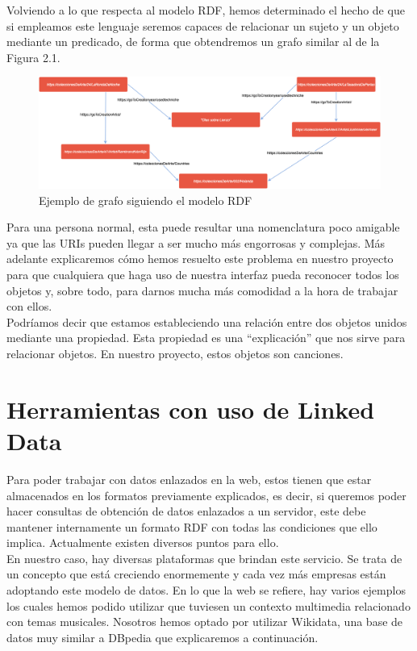 Volviendo a lo que respecta al modelo RDF, hemos determinado el hecho de que si empleamos este lenguaje seremos capaces de relacionar un sujeto y un objeto mediante un predicado, de forma que obtendremos un grafo similar al de la Figura 2.1.\\

\begin{figure}[h!]
	\centering
	\includegraphics[width = 1\textwidth]{Imagenes/Bitmap/RDFexample.png}
	\caption{Ejemplo de grafo siguiendo el modelo RDF}
	\label{fig:sampleImage}
\end{figure}

Para una persona normal, esta puede resultar una nomenclatura poco amigable ya que las URIs pueden llegar a ser mucho más engorrosas y complejas. Más adelante explicaremos cómo hemos resuelto este problema en nuestro proyecto para que cualquiera que haga uso de nuestra interfaz pueda reconocer todos los objetos y, sobre todo, para darnos mucha más comodidad a la hora de trabajar con ellos.\\

Podríamos decir que estamos estableciendo una relación entre dos objetos unidos mediante una propiedad. Esta propiedad es una ``explicación'' que nos sirve para relacionar objetos. En nuestro proyecto, estos objetos son canciones.\\


\section{Herramientas con uso de Linked Data}

Para poder trabajar con datos enlazados en la web, estos tienen que estar almacenados en los formatos previamente explicados, es decir, si queremos poder hacer consultas de obtención de datos enlazados a un servidor, este debe mantener internamente un formato RDF con todas las condiciones que ello implica. Actualmente existen diversos puntos para ello.\\

En nuestro caso, hay diversas plataformas que brindan este servicio. Se trata de un concepto que está creciendo enormemente y cada vez más empresas están adoptando este modelo de datos. En lo que la web se refiere, hay varios ejemplos los cuales hemos podido utilizar que tuviesen un contexto multimedia relacionado con temas musicales. Nosotros hemos optado por utilizar Wikidata, una base de datos muy similar a DBpedia que explicaremos a continuación.


